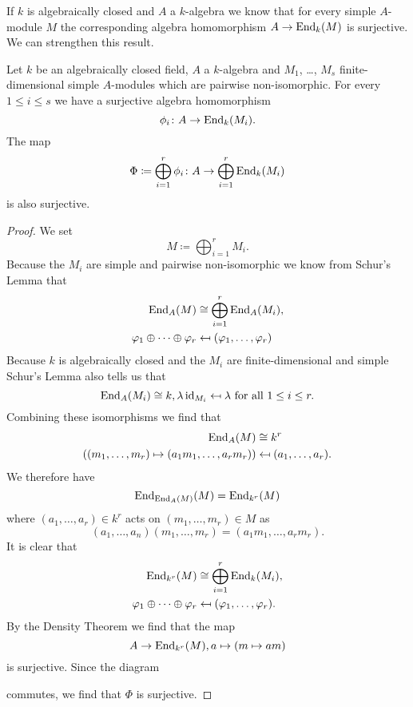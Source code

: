 If $k$ is algebraically closed and $A$ a  $k$-algebra we know that for every simple $A$-module $M$ the corresponding algebra homomorphism $A \to \operatorname{End}_k(M)$ is surjective. We can strengthen this result.


\begin{lem}\label{lem: map into sum endomorphisms surjective}
 Let $k$ be an algebraically closed field, $A$ a $k$-algebra and $M_1$, \dots, $M_s$ finite-dimensional simple $A$-modules which are pairwise non-isomorphic. For every $1 \leq i \leq s$ we have a surjective algebra homomorphism
 \[
  \phi_i \colon A \to \operatorname{End}_k(M_i).
 \]
 The map
 \[
  \Phi \coloneqq \bigoplus_{i=1}^r \phi_i \colon A \to \bigoplus_{i=1}^r \operatorname{End}_k(M_i)
 \]
 is also surjective.
\end{lem}
\begin{proof}
 We set
 \[
  M \coloneqq \bigoplus_{i=1}^r M_i.
 \]
 Because the $M_i$ are simple and pairwise non-isomorphic we know from Schur’s Lemma that
 \begin{align*}
  \operatorname{End}_A(M) &\cong \bigoplus_{i=1}^r \operatorname{End}_A(M_i), \\
  \varphi_1 \oplus \dotsb \oplus \varphi_r &\mapsfrom (\varphi_1, \dotsc, \varphi_r)
 \end{align*}
 Because $k$ is algebraically closed and the $M_i$ are finite-dimensional and simple Schur’s Lemma also tells us that
 \[
  \operatorname{End}_A(M_i) \cong k, \lambda \operatorname{id}_{M_i} \mapsfrom \lambda \text{ for all } 1 \leq i \leq r.
 \]
 Combining these isomorphisms we find that
 \begin{align*}
  \operatorname{End}_A(M) &\cong k^r \\
  ((m_1, \dotsc, m_r) \mapsto (a_1 m_1, \dotsc, a_r m_r)) & \mapsfrom (a_1, \dotsc, a_r).
 \end{align*}
 We therefore have
 \[
  \operatorname{End}_{\operatorname{End}_A(M)}(M) = \operatorname{End}_{k^r}(M)
 \]
 where $(a_1, \dotsc, a_r) \in k^r$ acts on $(m_1, \dotsc, m_r) \in M$ as
 \[
  (a_1, \dotsc, a_n)(m_1, \dotsc, m_r) = (a_1 m_1, \dotsc, a_r m_r).
 \]
 It is clear that
 \begin{align*}
  \operatorname{End}_{k^r}(M) &\cong \bigoplus_{i=1}^r \operatorname{End}_k(M_i), \\
  \varphi_1 \oplus \dotsb \oplus \varphi_r &\mapsfrom (\varphi_1, \dotsc, \varphi_r).
 \end{align*}
 By the Density Theorem we find that the map
 \[
  A \to \operatorname{End}_{k^r}(M), a \mapsto (m \mapsto am)
 \]
 is surjective. Since the diagram
 \begin{center}
 \end{center}
 commutes, we find that $\Phi$ is surjective.
\end{proof}


